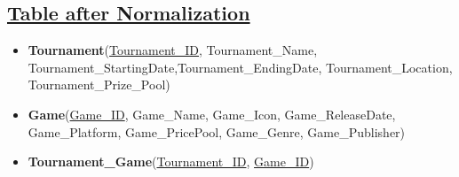 \subsection*{\underline{Table after Normalization}}
\begin{itemize}
    \item \textbf{Tournament}(\underline{Tournament\_ID}, Tournament\_Name, Tournament\_StartingDate,Tournament\_EndingDate, Tournament\_Location, Tournament\_Prize\_Pool)
    \item \textbf{Game}(\underline{Game\_ID}, Game\_Name, Game\_Icon, Game\_ReleaseDate, Game\_Platform, Game\_PricePool, Game\_Genre, Game\_Publisher)
    \item \textbf{Tournament\_Game}(\underline{Tournament\_ID}, \underline{Game\_ID})
\end{itemize}


\clearpage